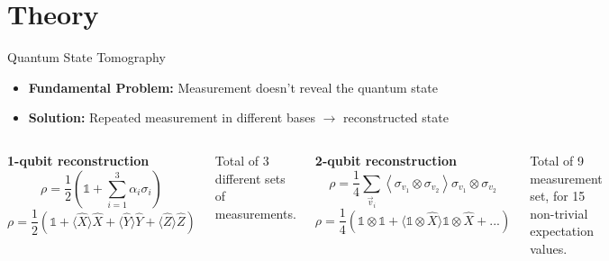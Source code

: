 \section{Theory}

\begin{frame}{Quantum State Tomography}
  \begin{itemize}
  \item \textbf{Fundamental Problem:} Measurement doesn't reveal the quantum state
  \item \textbf{Solution:} Repeated measurement in different bases $\rightarrow$
      reconstructed state
  \end{itemize}
  \vspace{0.5cm}

  \begin{columns}
    \centering \textbf{1-qubit reconstruction}
      \begin{equation*}
        \rho=\frac{1}{2}\left(\mathbb{1}+\sum_{i=1}^3\alpha_i\sigma_i\right)
      \end{equation*}
      \begin{equation*}
        \rho=\frac{1}{2}\left(\mathbb{1}
          + \langle \hat{X} \rangle \hat{X}
          + \langle \hat{Y} \rangle \hat{Y}
          + \langle \hat{Z} \rangle \hat{Z} \right)
      \end{equation*}

      \vspace{0.7cm}
      Total of 3 different sets of measurements.

    \centering \textbf{2-qubit reconstruction}
    \begin{equation*}
      \rho=\frac{1}{4}\sum_{\vec{v}_i}\left\langle\sigma_{v_1}
        \otimes\sigma_{v_2}\right\rangle\sigma_{v_1}\otimes\sigma_{v_2} 
    \end{equation*}
    \begin{equation*}
      \rho=\frac{1}{4}\left(\mathbb{1} \otimes \mathbb{1}
        + \langle \mathbb{1} \otimes \hat{X} \rangle \mathbb{1} \otimes \hat{X} +
         ...\right)
    \end{equation*}

    \vspace{0.7cm}
    Total of 9 measurement set, for 15 non-trivial expectation values.

  \end{columns} 
\end{frame}


